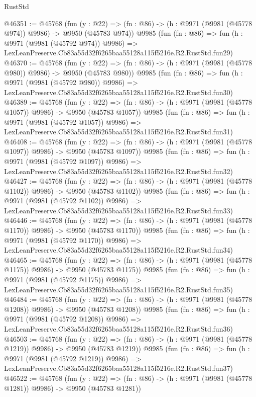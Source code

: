 \begin{lexlean}{RustStd}
\begin{coremodule}
@46351 := @45768
    (fun (y : @22) => (fn : @86) -> (h : @9971 (@9981 (@45778 @974)) @9986) -> @9950 (@45783 @974))
    @9985
    (fun (fn : @86) =>
    fun (h : @9971 (@9981 (@45792 @974)) @9986) =>
    LexLeanPreserve.Cb83a55d32f6265baa55128a115f5216e.R2.RustStd.fun29)
@46370 := @45768
    (fun (y : @22) => (fn : @86) -> (h : @9971 (@9981 (@45778 @980)) @9986) -> @9950 (@45783 @980))
    @9985
    (fun (fn : @86) =>
    fun (h : @9971 (@9981 (@45792 @980)) @9986) =>
    LexLeanPreserve.Cb83a55d32f6265baa55128a115f5216e.R2.RustStd.fun30)
@46389 := @45768
    (fun (y : @22) =>
    (fn : @86) -> (h : @9971 (@9981 (@45778 @1057)) @9986) -> @9950 (@45783 @1057))
    @9985
    (fun (fn : @86) =>
    fun (h : @9971 (@9981 (@45792 @1057)) @9986) =>
    LexLeanPreserve.Cb83a55d32f6265baa55128a115f5216e.R2.RustStd.fun31)
@46408 := @45768
    (fun (y : @22) =>
    (fn : @86) -> (h : @9971 (@9981 (@45778 @1097)) @9986) -> @9950 (@45783 @1097))
    @9985
    (fun (fn : @86) =>
    fun (h : @9971 (@9981 (@45792 @1097)) @9986) =>
    LexLeanPreserve.Cb83a55d32f6265baa55128a115f5216e.R2.RustStd.fun32)
@46427 := @45768
    (fun (y : @22) =>
    (fn : @86) -> (h : @9971 (@9981 (@45778 @1102)) @9986) -> @9950 (@45783 @1102))
    @9985
    (fun (fn : @86) =>
    fun (h : @9971 (@9981 (@45792 @1102)) @9986) =>
    LexLeanPreserve.Cb83a55d32f6265baa55128a115f5216e.R2.RustStd.fun33)
@46446 := @45768
    (fun (y : @22) =>
    (fn : @86) -> (h : @9971 (@9981 (@45778 @1170)) @9986) -> @9950 (@45783 @1170))
    @9985
    (fun (fn : @86) =>
    fun (h : @9971 (@9981 (@45792 @1170)) @9986) =>
    LexLeanPreserve.Cb83a55d32f6265baa55128a115f5216e.R2.RustStd.fun34)
@46465 := @45768
    (fun (y : @22) =>
    (fn : @86) -> (h : @9971 (@9981 (@45778 @1175)) @9986) -> @9950 (@45783 @1175))
    @9985
    (fun (fn : @86) =>
    fun (h : @9971 (@9981 (@45792 @1175)) @9986) =>
    LexLeanPreserve.Cb83a55d32f6265baa55128a115f5216e.R2.RustStd.fun35)
@46484 := @45768
    (fun (y : @22) =>
    (fn : @86) -> (h : @9971 (@9981 (@45778 @1208)) @9986) -> @9950 (@45783 @1208))
    @9985
    (fun (fn : @86) =>
    fun (h : @9971 (@9981 (@45792 @1208)) @9986) =>
    LexLeanPreserve.Cb83a55d32f6265baa55128a115f5216e.R2.RustStd.fun36)
@46503 := @45768
    (fun (y : @22) =>
    (fn : @86) -> (h : @9971 (@9981 (@45778 @1219)) @9986) -> @9950 (@45783 @1219))
    @9985
    (fun (fn : @86) =>
    fun (h : @9971 (@9981 (@45792 @1219)) @9986) =>
    LexLeanPreserve.Cb83a55d32f6265baa55128a115f5216e.R2.RustStd.fun37)
@46522 := @45768
    (fun (y : @22) =>
    (fn : @86) -> (h : @9971 (@9981 (@45778 @1281)) @9986) -> @9950 (@45783 @1281))

\end{coremodule}
\end{lexlean}
